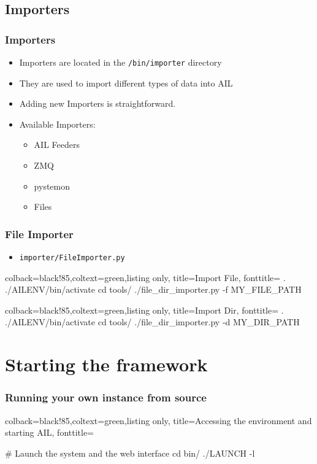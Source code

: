 \documentclass{beamer}
\begin{document}
\subsection{Importers}

\begin{frame}
    \frametitle{Importers}
    \begin{itemize}
        \item Importers are located in the \texttt{/bin/importer} directory
        \item They are used to import different types of data into AIL
        \item Adding new Importers is straightforward.
        \item Available Importers:
            \begin{itemize}
                \item AIL Feeders
                \item ZMQ
                \item pystemon
                \item Files
            \end{itemize}
    \end{itemize}
\end{frame}


\lstset{style=bash}
\begin{frame}[fragile]
    \frametitle{File Importer}
    \begin{itemize}
        \item \texttt{importer/FileImporter.py}
    \end{itemize}
    \begin{tcblisting}{colback=black!85,coltext=green,listing only,
        title=Import File, fonttitle=\bfseries}
. ./AILENV/bin/activate
cd tools/
./file_dir_importer.py -f MY_FILE_PATH
    \end{tcblisting}
    \begin{tcblisting}{colback=black!85,coltext=green,listing only,
        title=Import Dir, fonttitle=\bfseries}
. ./AILENV/bin/activate
cd tools/
./file_dir_importer.py -d MY_DIR_PATH
    \end{tcblisting}
\end{frame}




\section{Starting the framework}
\lstset{style=bash}
\begin{frame}[fragile]
    \frametitle{Running your own instance from source}
    \begin{tcblisting}{colback=black!85,coltext=green,listing only,
        title=Accessing the environment and starting AIL, fonttitle=\bfseries}

# Launch the system and the web interface
cd bin/
./LAUNCH -l

\end{tcblisting}
\end{frame}
\end{document}
